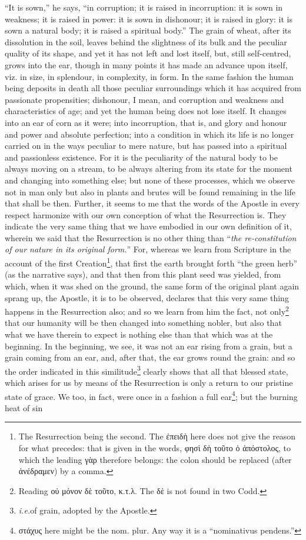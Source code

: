 “It is sown,” he says, “in corruption; it is raised in incorruption: it is sown in weakness; it is raised in power: it is sown in dishonour; it is raised in glory: it is sown a natural body; it is raised a spiritual body.” The grain of wheat, after its dissolution in the soil, leaves behind the slightness of its bulk and the peculiar quality of its shape, and yet it has not left and lost itself, but, still self-centred, grows into the ear, though in many points it has made an advance upon itself, viz. in size, in splendour, in complexity, in form. In the same fashion the human being deposits in death all those peculiar surroundings which it has acquired from passionate propensities; dishonour, I mean, and corruption and weakness and characteristics of age; and yet the human being does not lose itself. It changes into an ear of corn as it were; into incorruption, that is, and glory and honour and power and absolute perfection; into a condition in which its life is no longer carried on in the ways peculiar to mere nature, but has passed into a spiritual and passionless existence. For it is the peculiarity of the natural body to be always moving on a stream, to be always altering from its state for the moment and changing into something else; but none of these processes, which we observe not in man only but also in plants and brutes will be found remaining in the life that shall be then. Further, it seems to me that the words of the Apostle in every respect harmonize with our own conception of what the Resurrection is. They indicate the very same thing that we have embodied in our own definition of it, wherein we said that the Resurrection is no other thing than “\emph{the re-constitution of our nature in its original form.}” For, whereas we learn from Scripture in the account of the first Creation\footnote{The Resurrection being the second. The \textgreek{ἐπειδὴ} here does not give the reason for what precedes: that is given in the words, \textgreek{φησὶ δὴ τοῦτο ὁ ἀπόστολος}, to which the leading \textgreek{γὰρ} therefore belongs: the colon should be replaced (after \textgreek{ἀνέδραμεν}) by a comma.}, that first the earth brought forth “the green herb” (as the narrative says), and that then from this plant seed was yielded, from which, when it was shed on the ground, the same form of the original plant again sprang up, the Apostle, it is to be observed, declares that this very same thing happens in the Resurrection also; and so we learn from him the fact, not only\footnote{Reading \textgreek{οὐ μόνον δὲ τοῦτο, κ.τ.λ}. The \textgreek{δὲ} is not found in two Codd.} that our humanity will be then changed into something nobler, but also that what we have therein to expect is nothing else than that which was at the beginning. In the beginning, we see, it was not an ear rising from a grain, but a grain coming from an ear, and, after that, the ear grows round the grain: and so the order indicated in this similitude\footnote{\emph{i.e.}of grain, adopted by the Apostle.} clearly shows that all that blessed state, which arises for us by means of the Resurrection is only a return to our pristine state of grace. We too, in fact, were once in a fashion a full ear\footnote{\textgreek{στάχυς} here might be the nom. plur. Any way it is a “nominativus pendens.”}; but the burning heat of sin 
